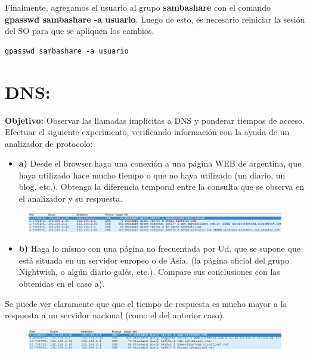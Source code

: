 \documentclass[12pt]{extarticle}
\providecommand{\tightlist}{%
      \setlength{\itemsep}{0pt}\setlength{\parskip}{0pt}}
\begin{document}
Finalmente, agregamos el usuario al grupo \textbf{sambashare} con el
comando \textbf{gpasswd sambashare -a usuario}. Luego de esto, es
necesario reiniciar la sesión del SO para que se apliquen los cambios.

\begin{verbatim}
gpasswd sambashare -a usuario
\end{verbatim}

    \section{DNS:}\label{dns}

\textbf{Objetivo:} Observar las llamadas implícitas a DNS y ponderar
tiempos de acceso. Efectuar el siguiente experimento, verificando
información con la ayuda de un analizador de protocolo:

\begin{itemize}
\tightlist
\item
  \textbf{a)} Desde el browser haga una conexión a una página WEB de
  argentina, que haya utilizado hace mucho tiempo o que no haya
  utilizado (un diario, un blog, etc.). Obtenga la diferencia temporal
  entre la consulta que se observa en el analizador y su respuesta.
\end{itemize}

\begin{figure}[h]
\centering
\includegraphics{images/server_nacional.png}
\caption{}
\end{figure}

\begin{itemize}
\tightlist
\item
  \textbf{b)} Haga lo mismo con una página no frecuentada por Ud. que se
  supone que está situada en un servidor europeo o de Asia. (la página
  oficial del grupo Nightwish, o algún diario galés, etc.). Compare sus
  conclusiones con las obtenidas en el caso a).
\end{itemize}

Se puede ver claramente que que el tiempo de respuesta es mucho mayor a
la respuesta a un servidor nacional (como el del anterior caso).

\begin{figure}[h]
\centering
\includegraphics{images/server_externo.png}
\caption{}
\end{figure}
\end{document}
